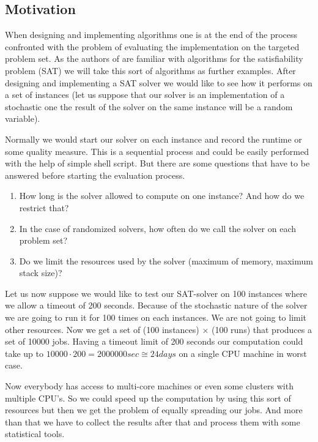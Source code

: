 \subsection{Motivation}


When designing and implementing algorithms one is at the end of the process confronted with the problem of evaluating the implementation on the targeted problem set. As the authors of \edacc are familiar with algorithms for the satisfiability problem (SAT) we will take this sort of algorithms as further examples. After designing and implementing a SAT solver we would like to see how it performs on a set of instances (let us suppose that our solver is an implementation of a stochastic one \ie the result of the solver on the same instance will be a random variable).

Normally we would start our solver on each instance and record the runtime or some quality measure. This is a sequential process and could be easily performed with the help of simple shell script. But there are some questions that have to be answered before starting the evaluation process. 

\begin{enumerate}
\item How long is the solver allowed to compute on one instance? And how do we restrict that?
\item In the case of randomized solvers, how often do we call the solver on each problem set?
\item Do we limit the resources used by the solver (\ie maximum of memory, maximum stack size)?
\end{enumerate}

Let us now suppose we would like to test our SAT-solver on 100 instances where we allow a timeout of 200 seconds. \marginlabel{\Eexample}  Because of the stochastic nature of the solver we are going to run it for 100 times on each instances. We are not going to limit other resources. Now we get a set of (100 instances) $\times$ (100 runs) that produces a set of 10000 jobs. Having a timeout limit of 200 seconds our computation could take up to $10000\cdot 200=2000000sec\cong24 days$ on a single CPU machine in worst case. 

Now everybody has access to multi-core machines or even some clusters with multiple CPU's. So we could speed up the computation by using this sort of resources but then we get the problem of equally spreading our jobs. And more than that we have to collect the results after that and process them with some statistical tools. 


